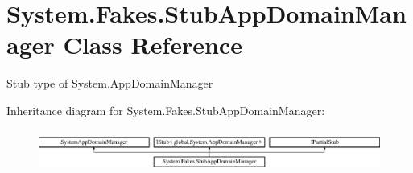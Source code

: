 \hypertarget{class_system_1_1_fakes_1_1_stub_app_domain_manager}{\section{System.\-Fakes.\-Stub\-App\-Domain\-Manager Class Reference}
\label{class_system_1_1_fakes_1_1_stub_app_domain_manager}
}


Stub type of System.\-App\-Domain\-Manager 


Inheritance diagram for System.\-Fakes.\-Stub\-App\-Domain\-Manager\-:\begin{figure}[H]
\begin{center}
\leavevmode
\includegraphics[height=1.382716cm]{class_system_1_1_fakes_1_1_stub_app_domain_manager}
\end{center}
\end{figure}
